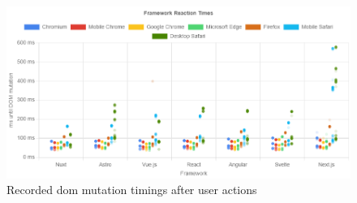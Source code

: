 \documentclass[a4paper, 12pt]{article}
\begin{document}
\begin{figure}[t]
  \centering
  \includegraphics[width=\linewidth, keepaspectratio]{img/playwright-results/userActions_byUserAction/total.png}
  \caption{Recorded \acrshort{dom} mutation timings after user actions}
  \label{fig:playwrightResults:total}
\end{figure}
\end{document}
